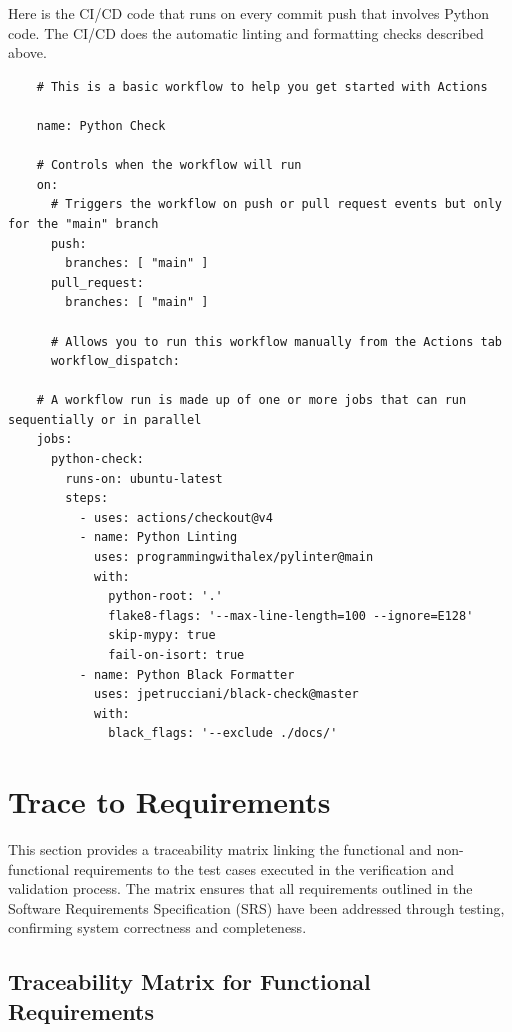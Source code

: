\documentclass[12pt, titlepage]{article}
\begin{document}
Here is the CI/CD code that runs on every commit push that involves Python code. The CI/CD does the automatic linting and formatting checks described above.
\begin{scriptsize}
    \begin{verbatim}
    # This is a basic workflow to help you get started with Actions
    
    name: Python Check
    
    # Controls when the workflow will run
    on:
      # Triggers the workflow on push or pull request events but only for the "main" branch
      push:
        branches: [ "main" ]
      pull_request:
        branches: [ "main" ]
    
      # Allows you to run this workflow manually from the Actions tab
      workflow_dispatch:
    
    # A workflow run is made up of one or more jobs that can run sequentially or in parallel
    jobs:
      python-check:
        runs-on: ubuntu-latest
        steps:
          - uses: actions/checkout@v4
          - name: Python Linting
            uses: programmingwithalex/pylinter@main
            with:
              python-root: '.'
              flake8-flags: '--max-line-length=100 --ignore=E128'
              skip-mypy: true
              fail-on-isort: true
          - name: Python Black Formatter
            uses: jpetrucciani/black-check@master
            with:
              black_flags: '--exclude ./docs/'
    \end{verbatim}
\end{scriptsize}

		
\section{Trace to Requirements}

This section provides a traceability matrix linking the functional and non-functional requirements to the test cases executed in the verification and validation process. The matrix ensures that all requirements outlined in the Software Requirements Specification (SRS) have been addressed through testing, confirming system correctness and completeness.

\subsection{Traceability Matrix for Functional Requirements}
\end{document}
